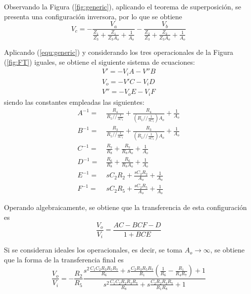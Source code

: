 Observando la Figura (\ref{fig:generic}), aplicando el teorema de superposición, se presenta una configuración inversora, por lo que se obtiene
\begin{equation}
	V_c = -\frac{V_a}{\frac{Z_1}{Z_3} + \frac{Z_1}{Z_3 A_o} + \frac{1}{A_o}} - \frac{V_b}{\frac{Z_2}{Z_3} + \frac{Z_2}{Z_3 A_o} + \frac{1}{A_o}}
	\label{equ:generic}
\end{equation}

Aplicando (\ref{equ:generic}) y considerando los tres operacionales de la Figura (\ref{fig:FT}) iguales, se obtiene el siguiente sistema de ecuaciones:
\begin{equation}
\begin{split}
	V' = - V_i A - V'' B \\
	V_o = - V' C - V_i D \\
	V'' = - V_o E - V_i F
\end{split}
\end{equation}
siendo las constantes empleadas las siguientes:
\begin{equation}
\begin{split}
	A^{-1} =& \ \frac{R_4}{R_1 // \frac{1}{sC_1}} + \frac{R_4}{\left( R_1 // \frac{1}{sC_1} \right) A_o} + \frac{1}{A_o} \\
	B^{-1} =& \ \frac{R_3}{R_1 // \frac{1}{sC_1}} + \frac{R_3}{\left( R_1 // \frac{1}{sC_1} \right) A_o} + \frac{1}{A_o} \\
	C^{-1} =& \ \frac{R_7}{R_8} + \frac{R_7}{R_8 A_o} + \frac{1}{A_o} \\
	D^{-1} =& \ \frac{R_6}{R_8} + \frac{R_6}{R_8 A_o} + \frac{1}{A_o} \\
	E^{-1} =& \ sC_2R_2 + \frac{sC_2R_2}{A_o} + \frac{1}{A_o} \\
	F^{-1} =& \ sC_2R_5 + \frac{sC_2R_5}{A_o} + \frac{1}{A_o}
\end{split}
\end{equation}

Operando algebraicamente, se obtiene que la transferencia de esta configuración es
\begin{equation}
	\frac{V_o}{V_i} = \frac{AC - BCF - D}{1 + BCE}
	\label{equ:transf-ft-r}
\end{equation}

Si se consideran ideales los operacionales, es decir, se toma $A_o \rightarrow \infty$, se obtiene que la forma de la transferencia final es
\begin{equation}
	\frac{V_o}{V_i} = - \frac{R_2}{R_5} \frac{s^{2} \frac{C_1 C_2 R_3 R_5 R_7}{R_6} + s \frac{C_2 R_3 R_5 R_7}{R_1} \left( \frac{1}{R_6} - \frac{R_1}{R_4 R_7} \right) + 1}{s^{2} \frac{C_1 C_2 R_2 R_3 R_7}{R_8} + s \frac{C_2 R_2 R_3 R_7}{R_1 R_8} + 1}
\label{equ:transf-ft-i}
\end{equation}

